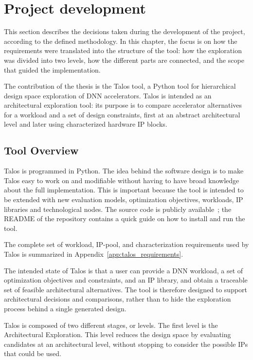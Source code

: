 \clearpage
\section{Project development}

This section describes the decisions taken during the development of
the project, according to the defined methodology. In this
chapter, the focus is on how the requirements were translated into the
structure of the tool: how the exploration was divided into two
levels, how the different parts are connected, and the scope that
guided the implementation.

The contribution of the thesis is the Talos tool, a Python tool for
hierarchical design space exploration of DNN accelerators. Talos is
intended as an architectural exploration tool: its purpose is to
compare accelerator alternatives for a workload and a set of design
constraints, first at an abstract architectural level and later using
characterized hardware IP blocks.

\subsection{Tool Overview}
Talos is programmed in Python. The idea behind the software design is
to make Talos easy to work on and modifiable without having to have
broad knowledge about the full implementation. This is important
because the tool is intended to be extended with new evaluation
models, optimization objectives, workloads, IP libraries and technological nodes.
The source code is publicly available~\cite{talos_repo}; the README of
the repository contains a quick guide on how to install and run the
tool.

The complete set of workload, IP-pool, and characterization
requirements used by Talos is summarized in
Appendix~\ref{app:talos_requirements}.

The intended state of Talos is that a user can provide a DNN
workload, a set of optimization objectives and constraints, and an IP
library, and obtain a traceable set of feasible architectural
alternatives. The tool is therefore designed to support architectural
decisions and comparisons, rather than to hide the exploration
process behind a single generated design.

Talos is composed of two different stages, or levels. The first level
is the Architectural Exploration. This level reduces the design space
by evaluating candidates at an architectural level, without stopping
to consider the possible IPs that could be used.

